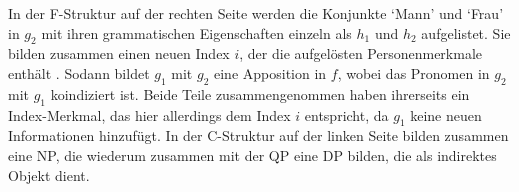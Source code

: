 In der F-Struktur auf der rechten Seite werden die
Konjunkte  `Mann' und  `Frau' in $g_2$ mit ihren
grammatischen Eigenschaften einzeln als $h_1$ und $h_2$ aufgelistet. Sie bilden
zusammen einen neuen Index $i$, der die aufgelösten Personenmerkmale enthält%
. Sodann bildet $g_1$ mit $g_2$ eine Apposition in $f$, wobei
das Pronomen  in $g_2$ mit $g_1$ koindiziert ist. Beide Teile
zusammengenommen haben ihrerseits ein Index-Merkmal, das hier allerdings dem
Index $i$ entspricht, da $g_1$ keine neuen Informationen hinzufügt. In der
C-Struktur auf der linken Seite bilden  zusammen eine NP,
die wiederum zusammen mit der QP  eine DP
bilden, die als indirektes Objekt dient.
